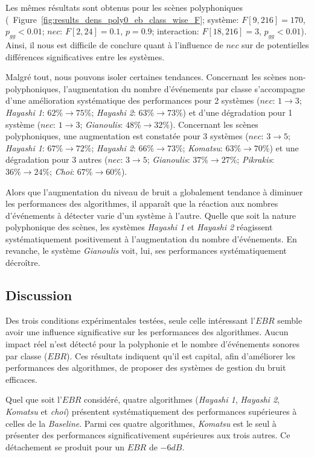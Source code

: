 Les mêmes résultats sont obtenus pour les scènes polyphoniques (\cf~Figure~\ref{fig:results_dens_poly0_eb_class_wise_F}; système: $F[9,216]=170$, $p_{gg}<0.01$; $nec$: $F[2,24]=0.1$, $p=0.9$; interaction: $F[18,216]=3$, $p_{gg}<0.01$). Ainsi, il nous est difficile de conclure quant à l'influence de $nec$ sur de potentielles différences significatives entre les systèmes.

Malgré tout, nous pouvons isoler certaines tendances. Concernant les scènes non-polyphoniques, l'augmentation du nombre d'événements par classe s'accompagne d'une amélioration systématique des performances pour 2 systèmes ($nec$: $1\rightarrow 3$; \emph{Hayashi 1}: $62\%\rightarrow 75\%$; \emph{Hayashi 2}: $63\%\rightarrow 73\%$) et d'une dégradation pour 1 système ($nec$: $1\rightarrow 3$; \emph{Gianoulis}: $48\%\rightarrow 32\%$). Concernant les scènes polyphoniques, une augmentation est constatée pour 3 systèmes ($nec$: $3\rightarrow 5$; \emph{Hayashi 1}: $67\%\rightarrow 72\%$; \emph{Hayashi 2}: $66\%\rightarrow 73\%$; \emph{Komatsu}: $63\%\rightarrow 70\%$) et une dégradation pour 3 autres ($nec$: $3\rightarrow 5$; \emph{Gianoulis}: $37\%\rightarrow 27\%$; \emph{Pikrakis}: $36\%\rightarrow 24\%$; \emph{Choi}: $67\%\rightarrow 60\%$).

Alors que l'augmentation du niveau de bruit a globalement tendance à diminuer les performances des algorithmes, il apparaît que la réaction aux nombres d'événements à détecter varie d'un système à l'autre. Quelle que soit la nature polyphonique des scènes, les systèmes \emph{Hayashi 1} et \emph{Hayashi 2} réagissent systématiquement positivement à l'augmentation du nombre d'événements. En revanche, le système \emph{Gianoulis} voit, lui, ses performances systématiquement décroître.

\subsection{Discussion}

Des trois conditions expérimentales testées, seule celle intéressant l'$EBR$ semble avoir une influence significative sur les performances des algorithmes. Aucun impact réel n'est détecté pour la polyphonie et le nombre d'événements sonores par classe ($EBR$). Ces résultats indiquent qu'il est capital, afin d'améliorer les performances des algorithmes, de proposer des systèmes de gestion du bruit efficaces.

Quel que soit l'$EBR$ considéré, quatre algorithmes (\emph{Hayashi 1}, \emph{Hayashi 2}, \emph{Komatsu} et \emph{choi}) présentent systématiquement des performances supérieures à celles de la \emph{Baseline}. Parmi ces quatre algorithmes, \emph{Komatsu} est le seul à présenter des performances significativement supérieures aux trois autres. Ce détachement se produit pour un $EBR$ de $-6dB$.


